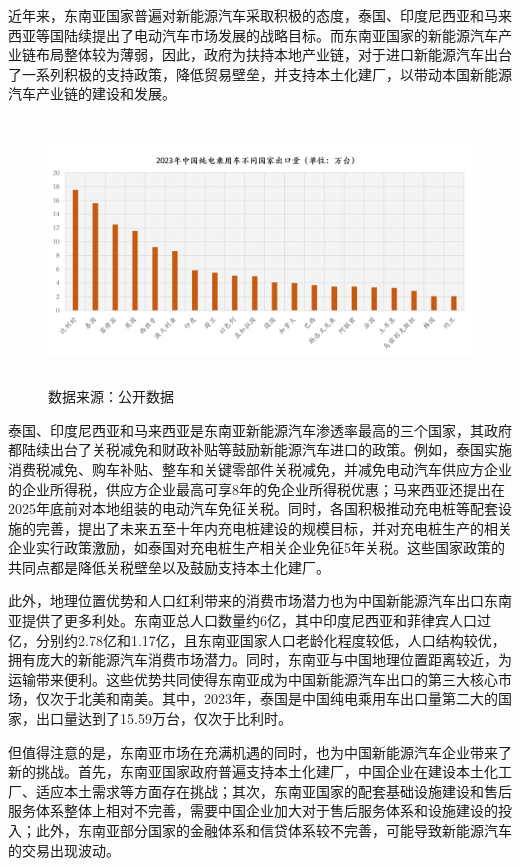 \documentclass[a4paper, 10pt]{article}
\begin{document}
    近年来，东南亚国家普遍对新能源汽车采取积极的态度，泰国、印度尼西亚和马来西亚等国陆续提出了电动汽车市场发展的战略目标。而东南亚国家的新能源汽车产业链布局整体较为薄弱，因此，政府为扶持本地产业链，对于进口新能源汽车出台了一系列积极的支持政策，降低贸易壁垒，并支持本土化建厂，以带动本国新能源汽车产业链的建设和发展。
    \begin{figure}[ht]
      \centering 
      \includegraphics[height=7.0cm,width=13.7cm]{fg6.png}
      
      \caption{数据来源：公开数据}
      \label{6}
      
      \end{figure}
    泰国、印度尼西亚和马来西亚是东南亚新能源汽车渗透率最高的三个国家，其政府都陆续出台了关税减免和财政补贴等鼓励新能源汽车进口的政策。例如，泰国实施消费税减免、购车补贴、整车和关键零部件关税减免，并减免电动汽车供应方企业的企业所得税，供应方企业最高可享8年的免企业所得税优惠；马来西亚还提出在2025年底前对本地组装的电动汽车免征关税。同时，各国积极推动充电桩等配套设施的完善，提出了未来五至十年内充电桩建设的规模目标，并对充电桩生产的相关企业实行政策激励，如泰国对充电桩生产相关企业免征5年关税。这些国家政策的共同点都是降低关税壁垒以及鼓励支持本土化建厂。

    此外，地理位置优势和人口红利带来的消费市场潜力也为中国新能源汽车出口东南亚提供了更多利处。东南亚总人口数量约6亿，其中印度尼西亚和菲律宾人口过亿，分别约2.78亿和1.17亿，且东南亚国家人口老龄化程度较低，人口结构较优，拥有庞大的新能源汽车消费市场潜力。同时，东南亚与中国地理位置距离较近，为运输带来便利。这些优势共同使得东南亚成为中国新能源汽车出口的第三大核心市场，仅次于北美和南美。其中，2023年，泰国是中国纯电乘用车出口量第二大的国家，出口量达到了15.59万台，仅次于比利时。
    


    但值得注意的是，东南亚市场在充满机遇的同时，也为中国新能源汽车企业带来了新的挑战。首先，东南亚国家政府普遍支持本土化建厂，中国企业在建设本土化工厂、适应本土需求等方面存在挑战；其次，东南亚国家的配套基础设施建设和售后服务体系整体上相对不完善，需要中国企业加大对于售后服务体系和设施建设的投入；此外，东南亚部分国家的金融体系和信贷体系较不完善，可能导致新能源汽车的交易出现波动。
\end{document}
